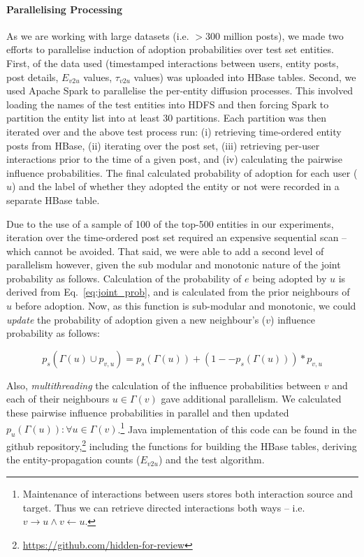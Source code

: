 \documentclass[sigconf,anonymous,review]{acmart}
\begin{document}
\paragraph{Parallelising Processing}
As we are working with large datasets (i.e. $>300$ million posts), we made two efforts to parallelise induction of adoption probabilities over test set entities.
First, of the data used (timestamped interactions between users, entity posts, post details, $E_{v2u}$ values, $\tau_{v2u}$ values) was uploaded into HBase tables.%
Second, we used Apache Spark%
 to parallelise the per-entity diffusion processes.
This involved loading the names of the test entities into HDFS and then forcing Spark to partition the entity list into at least 30 partitions.
Each partition was then iterated over and the above test process run: (i) retrieving time-ordered entity posts from HBase, (ii) iterating over the post set, (iii) retrieving per-user interactions prior to the time of a given post, and (iv) calculating the pairwise influence probabilities.
The final calculated probability of adoption for each user ($u$) and the label of whether they adopted the entity or not were recorded in a separate HBase table.

Due to the use of a sample of 100 of the top-500 entities in our experiments, iteration over the time-ordered post set required an expensive sequential scan -- which cannot be avoided.
That said, we were able to add a second level of parallelism however, given the sub modular and monotonic nature of the joint probability as follows.
Calculation of the probability of $e$ being adopted by $u$ is derived from Eq.~\ref{eq:joint_prob}, and is calculated from the prior neighbours of $u$ before adoption.
Now, as this function is sub-modular and monotonic, we could \emph{update} the probability of adoption given a new neighbour's ($v$) influence probability as follows:

\begin{equation}
p_s(\Gamma(u) \cup p_{v,u}) = p_s(\Gamma(u)) + (1 -- p_s(\Gamma(u))) * p_{v,u}
\end{equation}

Also, \emph{multithreading} the calculation of the influence probabilities between $v$ and each of their neighbours $u \in \Gamma(v)$ gave additional parallelism. We calculated these pairwise influence probabilities in parallel and then updated $p_u(\Gamma(u)) : \forall u \in \Gamma(v)$.\footnote{Maintenance of interactions between users stores both interaction source and target. Thus we can retrieve directed interactions both ways -- i.e. $v \rightarrow u \wedge v \leftarrow u$.}
Java implementation of this code can be found in the github repository,\footnote{\url{https://github.com/hidden-for-review}} including the functions for building the HBase tables, deriving the entity-propagation counts ($E_{v2u}$) and the test algorithm.
\end{document}
